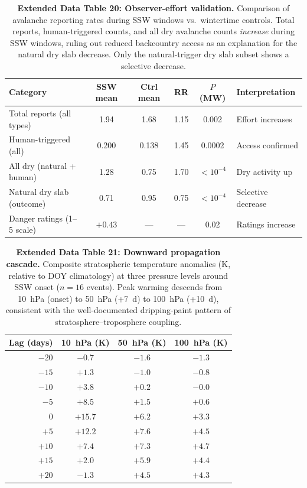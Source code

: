 \documentclass[11pt,letterpaper]{article}
\begin{document}
\begin{table}[!ht]
\centering
\caption{\textbf{Extended Data Table 20: Observer-effort validation.}
Comparison of avalanche reporting rates during SSW windows vs.\ wintertime controls. Total reports, human-triggered counts, and all dry avalanche counts \emph{increase} during SSW windows, ruling out reduced backcountry access as an explanation for the natural dry slab decrease. Only the natural-trigger dry slab subset shows a selective decrease.}
\label{tab:observer}
\small
\begin{tabular}{lccccl}
\toprule
Category & SSW mean & Ctrl mean & RR & $P$ (MW) & Interpretation \\
\midrule
Total reports (all types) & 1.94 & 1.68 & 1.15 & 0.002 & Effort increases \\
Human-triggered (all) & 0.200 & 0.138 & 1.45 & 0.0002 & Access confirmed \\
All dry (natural + human) & 1.28 & 0.75 & 1.70 & $< 10^{-4}$ & Dry activity up \\
Natural dry slab (outcome) & 0.71 & 0.95 & 0.75 & $< 10^{-4}$ & Selective decrease \\
Danger ratings (1--5 scale) & $+0.43$ & --- & --- & 0.02 & Ratings increase \\
\bottomrule
\end{tabular}
\end{table}


\begin{table}[!ht]
\centering
\caption{\textbf{Extended Data Table 21: Downward propagation cascade.}
Composite stratospheric temperature anomalies (K, relative to DOY climatology) at three pressure levels around SSW onset ($n = 16$ events). Peak warming descends from 10~hPa (onset) to 50~hPa (+7~d) to 100~hPa (+10~d), consistent with the well-documented dripping-paint pattern of stratosphere--troposphere coupling.}
\label{tab:propagation_cascade}
\small
\begin{tabular}{rccc}
\toprule
Lag (days) & 10~hPa (K) & 50~hPa (K) & 100~hPa (K) \\
\midrule
$-20$ & $-0.7$ & $-1.6$ & $-1.3$ \\
$-15$ & $+1.3$ & $-1.0$ & $-0.8$ \\
$-10$ & $+3.8$ & $+0.2$ & $-0.0$ \\
$-5$ & $+8.5$ & $+1.5$ & $+0.6$ \\
$0$ & $\mathbf{+15.7}$ & $+6.2$ & $+3.3$ \\
$+5$ & $+12.2$ & $+7.6$ & $+4.5$ \\
$+10$ & $+7.4$ & $+7.3$ & $\mathbf{+4.7}$ \\
$+15$ & $+2.0$ & $+5.9$ & $+4.4$ \\
$+20$ & $-1.3$ & $+4.5$ & $+4.3$ \\
\bottomrule
\end{tabular}
\end{table}
\end{document}
